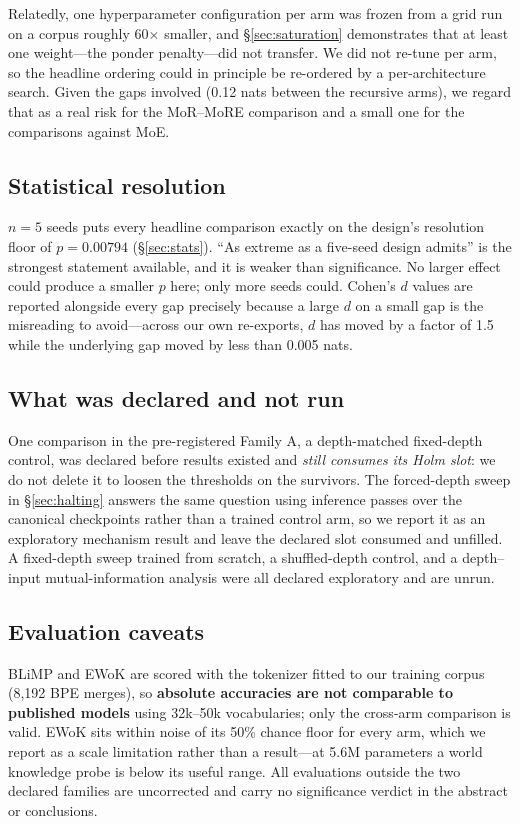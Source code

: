 Relatedly, one hyperparameter configuration per arm was frozen from a grid run on a
corpus roughly 60$\times$ smaller, and \S\ref{sec:saturation} demonstrates that at
least one weight---the ponder penalty---did not transfer. We did not re-tune per
arm, so the headline ordering could in principle be re-ordered by a per-architecture
search. Given the gaps involved (0.12 nats between the recursive arms), we regard
that as a real risk for the MoR--MoRE comparison and a small one for the comparisons
against MoE.

\subsection{Statistical resolution}

$n = 5$ seeds puts every headline comparison exactly on the design's resolution
floor of $p = 0.00794$ (\S\ref{sec:stats}). ``As extreme as a five-seed design
admits'' is the strongest statement available, and it is weaker than significance.
No larger effect could produce a smaller $p$ here; only more seeds could. Cohen's
$d$ values are reported alongside every gap precisely because a large $d$ on a
small gap is the misreading to avoid---across our own re-exports, $d$ has moved by
a factor of 1.5 while the underlying gap moved by less than 0.005 nats.

\subsection{What was declared and not run}

One comparison in the pre-registered Family A, a depth-matched fixed-depth control,
was declared before results existed and \emph{still consumes its Holm slot}: we do
not delete it to loosen the thresholds on the survivors. The forced-depth sweep in
\S\ref{sec:halting} answers the same question using inference passes over the
canonical checkpoints rather than a trained control arm, so we report it as an
exploratory mechanism result and leave the declared slot consumed and unfilled. A
fixed-depth sweep trained from scratch, a shuffled-depth control, and a
depth--input mutual-information analysis were all declared exploratory and are
unrun.

\subsection{Evaluation caveats}

BLiMP and EWoK are scored with the tokenizer fitted to our training corpus
(8{,}192 BPE merges), so \textbf{absolute accuracies are not comparable to
published models} using 32k--50k vocabularies; only the cross-arm comparison is
valid. EWoK sits within noise of its 50\% chance floor for every arm, which we
report as a scale limitation rather than a result---at 5.6M parameters a world
knowledge probe is below its useful range. All evaluations outside the two declared
families are uncorrected and carry no significance verdict in the abstract or
conclusions.

